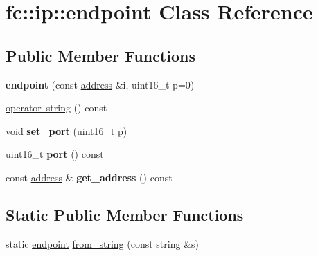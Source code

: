 \hypertarget{classfc_1_1ip_1_1endpoint}{}\section{fc\+:\+:ip\+:\+:endpoint Class Reference}
\label{classfc_1_1ip_1_1endpoint}
\subsection*{Public Member Functions}
\begin{DoxyCompactItemize}
\item 
\mbox{\label{classfc_1_1ip_1_1endpoint_a5105c2971d5a5d76a2ce87422d855233}} 
{\bfseries endpoint} (const \mbox{\hyperlink{classfc_1_1ip_1_1address}{address}} \&i, uint16\+\_\+t p=0)
\item 
\mbox{\hyperlink{classfc_1_1ip_1_1endpoint_a8a44fd8cffdec158ae2a548db5d64a56}{operator string}} () const
\item 
\mbox{\label{classfc_1_1ip_1_1endpoint_a3ec532f0d1fb4b815372fabdc19056f6}} 
void {\bfseries set\+\_\+port} (uint16\+\_\+t p)
\item 
\mbox{\label{classfc_1_1ip_1_1endpoint_ab243ed508cf8f9d34a32b2ece708466b}} 
uint16\+\_\+t {\bfseries port} () const
\item 
\mbox{\label{classfc_1_1ip_1_1endpoint_a61b2902b0e0e02172a60f3a17469f780}} 
const \mbox{\hyperlink{classfc_1_1ip_1_1address}{address}} \& {\bfseries get\+\_\+address} () const
\end{DoxyCompactItemize}
\subsection*{Static Public Member Functions}
\begin{DoxyCompactItemize}
\item 
static \mbox{\hyperlink{classfc_1_1ip_1_1endpoint}{endpoint}} \mbox{\hyperlink{classfc_1_1ip_1_1endpoint_a80c154405619b208c9d057d2c91958c9}{from\+\_\+string}} (const string \&s)
\end{DoxyCompactItemize}
